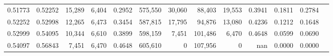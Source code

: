 \begin{tabular}{rrrrrrrrrrrrr}
0.51773 & 0.52252 & 15,289 & 6,404 &                                     0.2952 & 575,550 &  30,060 &  88,403 &  19,553 & 0.3941 & 0.1811 & 0.2784 \\
0.52252 & 0.52998 & 12,265 & 6,473 &                                     0.3454 & 587,815 &  17,795 &  94,876 &  13,080 & 0.4236 & 0.1212 & 0.1648 \\
0.52999 & 0.54095 & 10,344 & 6,610 &                                     0.3899 & 598,159 &   7,451 & 101,486 &   6,470 & 0.4648 & 0.0599 & 0.0690 \\
0.54097 & 0.56843 &  7,451 & 6,470 &                                     0.4648 & 605,610 &       0 & 107,956 &       0 &    nan & 0.0000 & 0.0000 \\
\bottomrule
\end{tabular}
